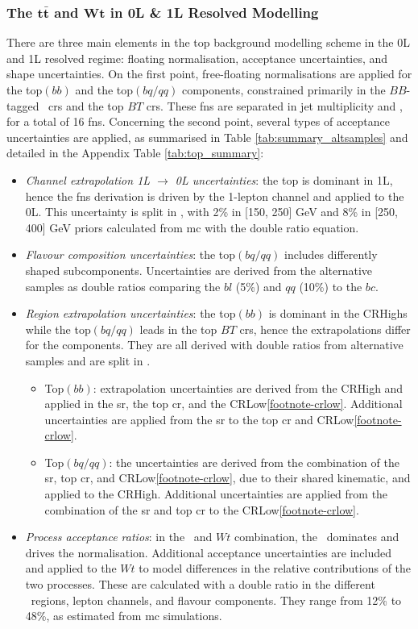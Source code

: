\subsubsection{The $\boldsymbol{t\bar{t}}$ and $\boldsymbol{Wt}$ in 0L \& 1L Resolved Modelling}
There are three main elements in the top background modelling scheme in the 0L and 1L resolved regime: floating normalisation, acceptance uncertainties, and shape uncertainties. On the first point, free-floating normalisations are applied for the top$(bb)$ and the top$(bq/qq)$ components, constrained primarily in the $BB$-tagged \highdr\ \glspl{cr} and the top $BT$ \glspl{cr}. These \glspl{fn} are separated in jet multiplicity and \ptv, for a total of 16 \glspl{fn}. Concerning the second point, several types of acceptance uncertainties are applied, as summarised in Table \ref{tab:summary_altsamples} and detailed in the Appendix Table \ref{tab:top_summary}:
\begin{itemize}[leftmargin=*]
    \item \textit{Channel extrapolation 1L $\rightarrow$ 0L uncertainties}: the top is dominant in 1L, hence the \glspl{fn} derivation is driven by the 1-lepton channel and applied to the 0L. This uncertainty is split in \ptv, with 2\% in [150, 250] GeV and 8\% in [250, 400] GeV priors calculated from \gls{mc} with the double ratio equation.
    \item \textit{Flavour composition uncertainties}: the top$(bq/qq)$ includes differently shaped subcomponents. Uncertainties are derived from the alternative samples as double ratios comparing the $bl$ (5\%) and $qq$ (10\%) to the $bc$. 
    \item \textit{Region extrapolation uncertainties}: the top$(bb)$ is dominant in the CRHighs while the top$(bq/qq)$ leads in the top $BT$ \glspl{cr}, hence the extrapolations differ for the components. They are all derived with double ratios from alternative samples and are split in \ptv.
    \begin{itemize}
        \item Top$(bb)$: extrapolation uncertainties are derived from the CRHigh and applied in the \gls{sr}, the top \gls{cr}, and the CRLow\cref{footnote-crlow}. Additional uncertainties are applied from the \gls{sr} to the top \gls{cr} and CRLow\cref{footnote-crlow}. 
        \item Top$(bq/qq)$: the uncertainties are derived from the combination of the \gls{sr}, top \gls{cr}, and CRLow\cref{footnote-crlow}, due to their shared kinematic, and applied to the CRHigh. Additional uncertainties are applied from the combination of the \gls{sr} and top \gls{cr} to the CRLow\cref{footnote-crlow}.
    \end{itemize}
    \item \textit{Process acceptance ratios}: in the \ttb\ and $Wt$ combination, the \ttb\ dominates and drives the normalisation. Additional acceptance uncertainties are included and applied to the $Wt$ to model differences in the relative contributions of the two processes. These are calculated with a double ratio in the different \ptv\ regions, lepton channels, and flavour components. They range from 12\% to 48\%, as estimated from \gls{mc} simulations.
\end{itemize}
